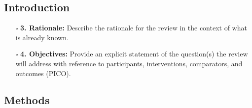 \documentclass[11pt]{article}
\def\tightlist{}
\begin{document}
\begin{Form}
\subsection{Introduction}\label{introduction}

\begin{itemize}
\tightlist
\item[$\square$]
  \textbf{3. Rationale:} Describe the rationale for the review in the
  context of what is already known.
\item[$\square$]
  \textbf{4. Objectives:} Provide an explicit statement of the
  question(s) the review will address with reference to participants,
  interventions, comparators, and outcomes (PICO).
\end{itemize}

\subsection{Methods}\label{methods}


\end{Form}
\end{document}
